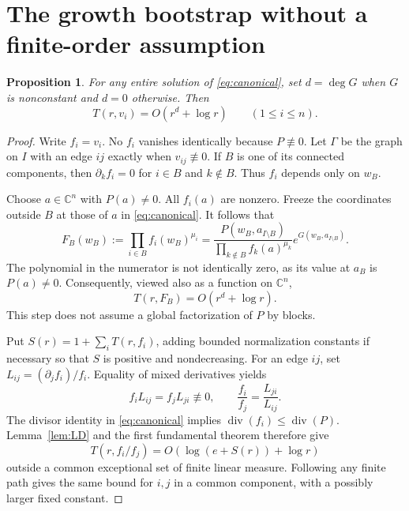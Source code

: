 \documentclass[11pt]{article}
\numberwithin{equation}{section}
\newtheorem{proposition}[theorem]{Proposition}
\theoremstyle{definition}\newtheorem{definition}[theorem]{Definition}
\theoremstyle{remark}\newtheorem{remark}[theorem]{Remark}
\newcommand{\C}{\mathbb C}
\newcommand{\Div}{\operatorname{div}}
\begin{document}
\section{The growth bootstrap without a finite-order assumption}
\begin{proposition}\label{prop:bootstrap}
For any entire solution of \eqref{eq:canonical}, set
$d=\deg G$ when $G$ is nonconstant and $d=0$ otherwise. Then
\begin{equation}\label{eq:bootbound}
 T(r,v_i)=O(r^d+\log r)\qquad(1\leq i\leq n).
\end{equation}
\end{proposition}
\begin{proof}
Write $f_i=v_i$. No $f_i$ vanishes identically because $P\not\equiv0$.
Let $\Gamma$ be the graph on $I$ with an edge $ij$ exactly when
$v_{ij}\not\equiv0$. If $B$ is one of its connected components, then
$\partial_k f_i=0$ for $i\in B$ and $k\notin B$. Thus $f_i$ depends
only on $w_B$.

Choose $a\in\C^n$ with $P(a)\ne0$. All $f_i(a)$ are nonzero. Freeze
the coordinates outside $B$ at those of $a$ in \eqref{eq:canonical}.
It follows that
\begin{equation}\label{eq:blockprod}
 F_B(w_B):=\prod_{i\in B}f_i(w_B)^{\mu_i}
 =\frac{P(w_B,a_{I\setminus B})}
 {\prod_{k\notin B}f_k(a)^{\mu_k}}
 e^{G(w_B,a_{I\setminus B})}.
\end{equation}
The polynomial in the numerator is not identically zero, as its value at
$a_B$ is $P(a)\ne0$. Consequently, viewed also as a function on $\C^n$,
\begin{equation}\label{eq:blockgrowth}
 T(r,F_B)=O(r^d+\log r).
\end{equation}
This step does not assume a global factorization of $P$ by blocks.

Put $S(r)=1+\sum_iT(r,f_i)$, adding bounded normalization constants if
necessary so that $S$ is positive and nondecreasing. For an edge $ij$,
set $L_{ij}=(\partial_j f_i)/f_i$. Equality of mixed derivatives yields
\begin{equation}\label{eq:ratio}
 f_i L_{ij}=f_j L_{ji}\not\equiv0,
 \qquad \frac{f_i}{f_j}=\frac{L_{ji}}{L_{ij}}.
\end{equation}
The divisor identity in \eqref{eq:canonical} implies
$\Div(f_i)\leq\Div(P)$. Lemma~\ref{lem:LD} and the first fundamental
theorem therefore give
\begin{equation}\label{eq:edgebound}
 T(r,f_i/f_j)=O(\log(e+S(r))+\log r)
\end{equation}
outside a common exceptional set of finite linear measure. Following any
finite path gives the same bound for $i,j$ in a common component, with a
possibly larger fixed constant.


\end{proof}
\end{document}
